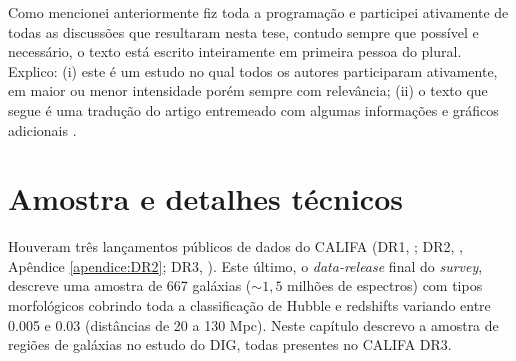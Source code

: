Como mencionei anteriormente fiz toda a programação e participei ativamente de todas as discussões que resultaram nesta tese, contudo sempre que possível e necessário, o texto está escrito inteiramente em primeira pessoa do plural. Explico: (i) este é um estudo no qual todos os autores participaram ativamente, em maior ou menor intensidade porém sempre com relevância; (ii) o texto que segue é uma tradução do artigo \citet[][Apêndice \ref{apendice:DIGpaper0}]{Lacerda.etal.2018} entremeado com algumas informações e gráficos adicionais
.





\chapter{Amostra e detalhes técnicos}
\label{sec:sample}

Houveram três lançamentos públicos de dados do CALIFA (DR1, \citealt{Husemann.etal.2013a}; DR2, \citealt{GarciaBenito.etal.2015a}, Apêndice \ref{apendice:DR2}; DR3, \citealt{SFSanchez.DR3.2016}). Este último, o {\em data-release} final do {\em survey}, descreve uma amostra de 667 galáxias ($\sim 1,5$ milhões de espectros) com tipos morfológicos cobrindo toda a classificação de Hubble e redshifts variando entre 0.005 e 0.03 (distâncias de 20 a 130 Mpc). Neste capítulo descrevo a amostra de regiões de galáxias no estudo do DIG, todas presentes no CALIFA DR3.


